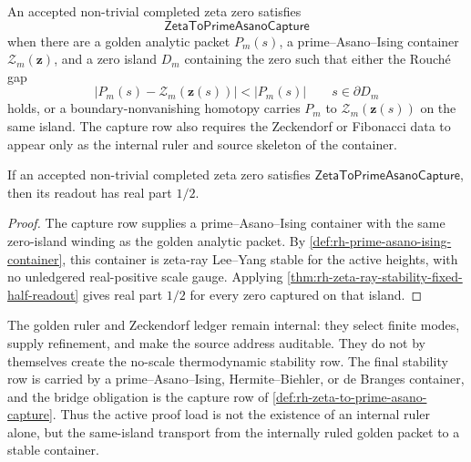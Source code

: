 \begin{definition}
\label{def:rh-zeta-to-prime-asano-capture}
An accepted non-trivial completed zeta zero satisfies
$$
\mathsf{ZetaToPrimeAsanoCapture}
$$
when there are a golden analytic packet $P_m(s)$, a
prime--Asano--Ising container $\mathcal Z_m(\mathbf z)$, and a zero
island $D_m$ containing the zero such that either the Rouch\'e gap
$$
\left|
P_m(s)-\mathcal Z_m(\mathbf z(s))
\right|
<
|P_m(s)|
\qquad
s\in\partial D_m
$$
holds, or a boundary-nonvanishing homotopy carries $P_m$ to
$\mathcal Z_m(\mathbf z(s))$ on the same island.  The capture row also
requires the Zeckendorf or Fibonacci data to appear only as the internal
ruler and source skeleton of the container.
\end{definition}

\begin{theorem}
\label{thm:rh-prime-asano-capture-fixed-half-readout}
If an accepted non-trivial completed zeta zero satisfies
$\mathsf{ZetaToPrimeAsanoCapture}$, then its readout has real part
$1/2$.
\end{theorem}

\begin{proof}
The capture row supplies a prime--Asano--Ising container with the same
zero-island winding as the golden analytic packet.  By
\autoref{def:rh-prime-asano-ising-container}, this container is
zeta-ray Lee--Yang stable for the active heights, with no unledgered
real-positive scale gauge.  Applying
\autoref{thm:rh-zeta-ray-stability-fixed-half-readout} gives real part
$1/2$ for every zero captured on that island.
\end{proof}

\begin{principle}
\label{prin:rh-internal-ruler-not-final-container}
The golden ruler and Zeckendorf ledger remain internal: they select
finite modes, supply refinement, and make the source address auditable.
They do not by themselves create the no-scale thermodynamic stability
row.  The final stability row is carried by a prime--Asano--Ising,
Hermite--Biehler, or de Branges container, and the bridge obligation is
the capture row of
\autoref{def:rh-zeta-to-prime-asano-capture}.  Thus the active proof
load is not the existence of an internal ruler alone, but the same-island
transport from the internally ruled golden packet to a stable container.
\end{principle}

